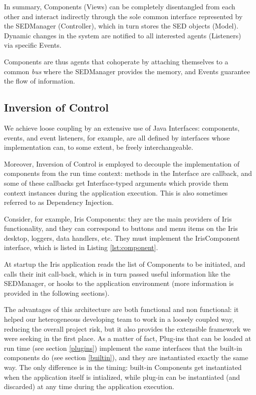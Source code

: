 In summary, Components (Views) can be completely disentangled from each other and interact indirectly through the sole common interface represented by the SEDManager (Controller), which in turn stores the SED objects (Model). Dynamic changes in the system are notified to all interested agents (Listeners) via specific Events.

Components are thus agents that cohoperate by attaching themselves to a common \emph{bus} where the SEDManager provides the memory, and Events guarantee the flow of information.

\subsection{Inversion of Control}
We achieve loose coupling by an extensive use of Java Interfaces: components, events, and event listeners, for example, are all defined by interfaces whose implementation can, to some extent, be freely interchangeable.

Moreover, Inversion of Control is employed to decouple the implementation of components from the run time context: methods in the Interface are callback, and some of these callbacks get Interface-typed arguments which provide them context instances during the application execution. This is also sometimes referred to as Dependency Injection.

Consider, for example, Iris Components: they are the main providers of Iris functionality, and they can correspond to buttons and menu items on the Iris desktop, loggers, data handlers, etc. They must implement the IrisComponent interface, which is listed in Listing \ref{lst:component}.

At startup the Iris application reads the list of Components to be initiated, and calls their init call-back, which is in turn passed useful information like the SEDManager, or hooks to the application environment (more information is provided in the following sections).

The advantages of this architecture are both functional and non functional: it helped our heterogeneous developing team to work in a loosely coupled way, reducing the overall project risk, but it also provides the extensible framework we were seeking in the first place. As a matter of fact, Plug-ins that can be loaded at run time (see section \ref{plugins}) implement the same interfaces that the built-in components do (see section \ref{builtin}), and they are instantiated exactly the same way. The only difference is in the timing: built-in Components get instantiated when the application itself is intialized, while plug-in can be instantiated (and discarded) at any time during the application execution.